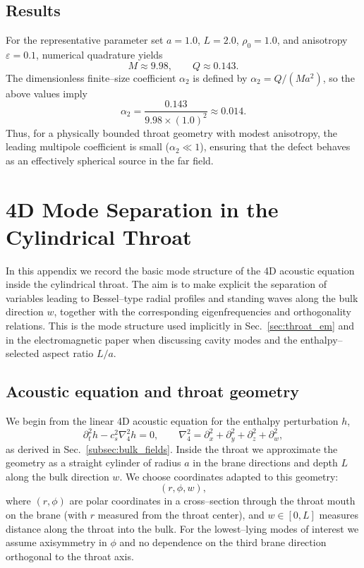 \documentclass[12pt]{article}
\begin{document}
\subsection{Results}

For the representative parameter set $a=1.0$, $L=2.0$, $\rho_0=1.0$, and anisotropy $\varepsilon=0.1$, numerical
quadrature yields
\begin{equation}
  M \approx 9.98,
  \qquad
  Q \approx 0.143.
\end{equation}
The dimensionless finite--size coefficient $\alpha_2$ is defined by
$\alpha_2 = Q/(M a^2)$, so the above values imply
\begin{equation}
  \alpha_2 = \frac{0.143}{9.98\times (1.0)^2} \approx 0.014.
\end{equation}
Thus, for a physically bounded throat geometry with modest anisotropy, the leading multipole coefficient is
small ($\alpha_2\ll 1$), ensuring that the defect behaves as an effectively spherical source in the far field.

\section{4D Mode Separation in the Cylindrical Throat}
\label{app:mode_separation}

In this appendix we record the basic mode structure of the 4D acoustic
equation inside the cylindrical throat.  The aim is to make explicit the
separation of variables leading to Bessel--type radial profiles and standing
waves along the bulk direction $w$, together with the corresponding
eigenfrequencies and orthogonality relations.  This is the mode structure
used implicitly in Sec.~\ref{sec:throat_em} and in the electromagnetic
paper when discussing cavity modes and the enthalpy--selected aspect ratio
$L/a$.

\subsection{Acoustic equation and throat geometry}

We begin from the linear 4D acoustic equation for the enthalpy perturbation
$h$,
\begin{equation}
  \partial_t^2 h
  - c_s^2 \nabla_4^2 h
  = 0,
  \qquad
  \nabla_4^2
  = \partial_x^2 + \partial_y^2 + \partial_z^2 + \partial_w^2,
  \label{eq:app_4d_wave}
\end{equation}
as derived in Sec.~\ref{subsec:bulk_fields}.  Inside the throat we
approximate the geometry as a straight cylinder of radius $a$ in the brane
directions and depth $L$ along the bulk direction $w$.  We choose
coordinates adapted to this geometry:
\begin{equation}
  (r,\phi,w),
\end{equation}
where $(r,\phi)$ are polar coordinates in a cross--section through the
throat mouth on the brane (with $r$ measured from the throat center), and
$w\in[0,L]$ measures distance along the throat into the bulk.  For the
lowest--lying modes of interest we assume axisymmetry in $\phi$ and no
dependence on the third brane direction orthogonal to the throat axis.
\end{document}
